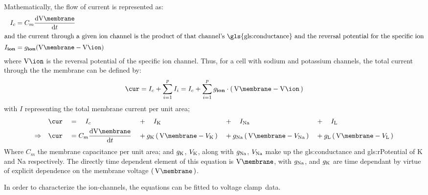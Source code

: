 \documentclass[../../Orator.tex]{subfiles}
\begin{document}
Mathematically, the flow of current is represented as:
    \begin{align}
        I_c &= C_m \ode{\unit{\V\membrane}} \\
        \intertext{and the current through a given ion channel is the product of that channel's \gls{gls:conductance} and the reversal potential for the specific ion}
        I_\bfm{ion} &= {g_\bfm{ion}}(\unit{\V\membrane}-\unit{\V\ion})  
    \end{align}
where \(\unit{\V\ion}\) is the reversal potential of the specific ion channel. Thus, for a cell with sodium and potassium channels, the total current through the the membrane can be defined by:
\begin{equation}
     \unit{\cur}  =  I_c + \sum_{i = 1}^{p} I_i =  I_c + \sum_{i = 1}^{p} g_\bfm{ion} \cdot \br{\unit{\V\membrane}-\unit{\V\ion}} 
\end{equation} 
with \(I\) representing the total membrane current per unit area; 
\begin{alignat}{5}
    &\quad \unit{\cur} &&= \quad I_c \quad&&+ \quad I_\rmm{K} \quad&&+ \quad I_\rmm{Na} \quad&&+ \quad I_\rmm{L} \\ 
    \implies &\quad \unit{\cur} &&= C_m \ode{\unit{\V\membrane}} &&+ {g}_\rmm{K}\br{\unit{\V\membrane} - V_\rmm{K}} &&+ {g}_\rmm{Na} \br{\unit{\V\membrane} - V_\rmm{Na}}  &&+ {g}_\rmm{L} \br{\unit{\V\membrane} - V_\rmm{L}} 
\end{alignat}
Where \(C_m\) the membrane capacitance per unit area; and \({g}_{\mathrm{K}}\), \(V_{\mathrm{K}}\), along with  \({g}_{\mathrm{Na}}\), \(V_{\mathrm{Na}}\) make up the \gls{gls:conductance} and \gls{gls:rPotential} of \gls{K} and \gls{Na} respectively.
The directly time dependent element of this equation is \(\unit{\V\membrane}\), with \({g}_{\mathrm{Na}}\), and \({g}_{\mathrm{K}}\) are time dependant by virtue of explicit dependence on the membrane voltage \(\br{\unit{\V\membrane}}\). 


In order to characterize the ion-channels, the equations can be fitted to voltage clamp\footnotemark~data.

\end{document}
